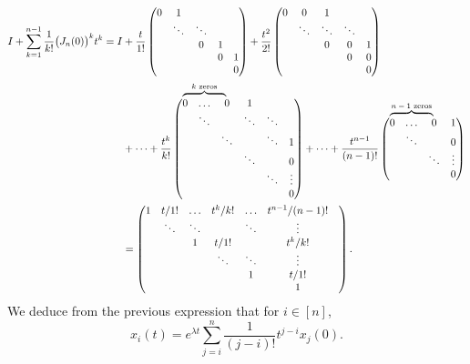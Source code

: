 \documentclass[11pt]{article}
\newcommand\bovermat[2]{%
  \makebox[0pt][l]{$\smash{\overbrace{\phantom{%
    \begin{matrix}#2\end{matrix}}}^{\text{#1}}}$}#2}
\begin{document}
\begin{align*}
    I+\sum_{k=1}^{n-1}\frac{1}{k!}\big(J_n(0)\big)^k t^k = I &+ \frac{t}{1!}
    \begin{pmatrix}
    0&1&&\\
    &\ddots&\ddots&&\\
    &&0&1&\\
    &&&0&1\\
    &&&&0
    \end{pmatrix} + \frac{t^2}{2!}
    \begin{pmatrix}
    0&0&1&\\
    &\ddots&\ddots&\ddots&\\
    &&0&0&1\\
    &&&0&0\\
    &&&&0
    \end{pmatrix}\\ \\
    &+ \dots +\frac{t^k}{k!}
    \begin{pmatrix}
    \bovermat{$k$ zeros}{0&\dots&0}&1&\\
    &\ddots&&\ddots&\ddots&\\
    &&\ddots&&\ddots&1\\
    &&&\ddots&&0\\
    &&&&\ddots&\vdots\\
    &&&&&0
    \end{pmatrix}
    +\dots+\frac{t^{n-1}}{(n-1)!}
    \begin{pmatrix}
    \bovermat{$n-1$ zeros}{0&\dots&0}&1\\
     &\ddots&&0\\
     & & \ddots & \vdots\\
     & & & 0\\
    \end{pmatrix}\\
    &=
    \begin{pmatrix}
    1 & t/1! & \dots & t^k/k! & \dots & t^{n-1}/(n-1)!\\
      & \ddots & \ddots &  & \ddots & \vdots\\
      & & 1 & t/1! & & t^k/k! &\\
      & & & \ddots & \ddots & \vdots\\
      & & & & 1 & t/1!\\
      & & & & & 1\\
    \end{pmatrix}.
\end{align*}
We deduce from the previous expression that for $i\in [n]$,
\begin{equation*}
    x_i(t)=e^{\lambda t} \sum^{n}_{j=i} \frac{1}{(j-i)!}t^{j-i}x_j(0).
\end{equation*}
\end{document}
